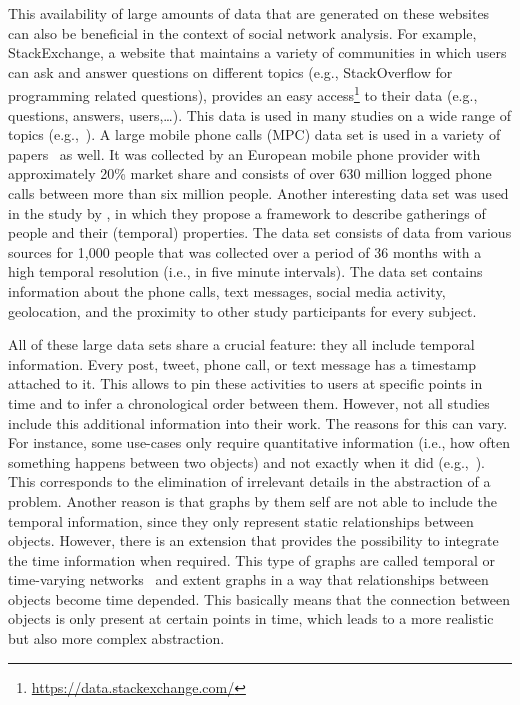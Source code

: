 This availability of large amounts of data that are generated on these websites can also be beneficial in the context of social network analysis.
For example, StackExchange, a website that maintains a variety of communities in which users can ask and answer questions on different topics (e.g., StackOverflow for programming related questions), provides an easy access\footnote{\url{https://data.stackexchange.com/}} to their data (e.g., questions, answers, users,\ldots).
This data is used in many studies on a wide range of topics (e.g.,~\cite{Danescu2013,Walk2016, Hasani-Mavriqi2016}).
A large mobile phone calls (MPC) data set is used in a variety of papers~\cite{Onnela2007, Karsai2014, Murase2015, Laurent2015} as well.
It was collected by an European mobile phone provider with approximately 20\% market share and consists of over 630 million logged phone calls between more than six million people.
Another interesting data set was used in the study by \citet{Sekara2016}, in which they propose a framework to describe gatherings of people and their (temporal) properties.
The data set consists of data from various sources for 1,000 people that was collected over a period of 36 months with a high temporal resolution (i.e., in five minute intervals).
The data set contains information about the phone calls, text messages, social media activity, geolocation, and the proximity to other study participants for every subject.

All of these large data sets share a crucial feature: they all include temporal information.
Every post, tweet, phone call, or text message has a timestamp attached to it.
This allows to pin these activities to users at specific points in time and to infer a chronological order between them.
However, not all studies include this additional information into their work.
The reasons for this can vary.
For instance, some use-cases only require quantitative information (i.e., how often something happens between two objects) and not exactly when it did  (e.g.,~\cite{Kumpula2007, Bagler2008}).
This corresponds to the elimination of irrelevant details in the abstraction of a problem.
Another reason is that graphs by them self are not able to include the temporal information, since they only represent static relationships between objects.
However, there is an extension that provides the possibility to integrate the time information when required.
This type of graphs are called temporal or time-varying networks~\cite{Holme2012, Holme2015} and extent graphs in a way that relationships between objects become time depended.
This basically means that the connection between objects is only present at certain points in time, which leads to a more realistic but also more complex abstraction.

